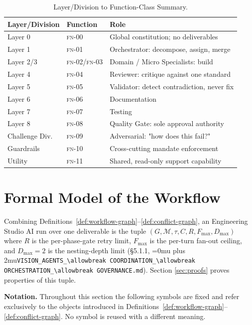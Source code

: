 \documentclass[12pt]{article}
\theoremstyle{definition}
\DeclareRobustCommand{\code}[1]{\begingroup\Urlmuskip=0mu plus 2mu\relax\nolinkurl{#1}\endgroup}
\newcommand{\FN}[1]{\textsc{fn-#1}}
\newcommand{\VisionGov}{\code{VISION\_AGENTS\_\allowbreak COORDINATION\_\allowbreak ORCHESTRATION\_\allowbreak GOVERNANCE.md}}
\begin{document}
\begin{table}[H]
\centering
\caption{Layer/Division to Function-Class Summary.}
\label{tab:layers}
\begin{tabular}{@{}llp{6.5cm}@{}}
\toprule
\textbf{Layer/Division} & \textbf{Function} & \textbf{Role} \\
\midrule
Layer 0 & \FN{00} & Global constitution; no deliverables \\
Layer 1 & \FN{01} & Orchestrator: decompose, assign, merge \\
Layer 2/3 & \FN{02}/\FN{03} & Domain / Micro Specialists: build \\
Layer 4 & \FN{04} & Reviewer: critique against one standard \\
Layer 5 & \FN{05} & Validator: detect contradiction, never fix \\
Layer 6 & \FN{06} & Documentation \\
Layer 7 & \FN{07} & Testing \\
Layer 8 & \FN{08} & Quality Gate: sole approval authority \\
Challenge Div. & \FN{09} & Adversarial: "how does this fail?" \\
Guardrails & \FN{10} & Cross-cutting mandate enforcement \\
Utility & \FN{11} & Shared, read-only support capability \\
\bottomrule
\end{tabular}
\end{table}

\section{Formal Model of the Workflow}
\label{sec:model}

Combining Definitions~\ref{def:workflow-graph}--\ref{def:conflict-graph}, an
Engineering Studio AI run over one deliverable is the tuple
$(G, \mathcal{M}, \tau, C, R, F_{\max}, D_{\max})$ where $R$ is the
per-phase-gate retry limit, $F_{\max}$ is the per-turn fan-out ceiling, and
$D_{\max} = 2$ is the nesting-depth limit (\S5.1.1,
\VisionGov{}). Section
\ref{sec:proofs} proves properties of this tuple.


\medskip
\noindent\textbf{Notation.}
Throughout this section the following symbols are fixed and refer
exclusively to the objects introduced in
Definitions~\ref{def:workflow-graph}--\ref{def:conflict-graph}.
No symbol is reused with a different meaning.
\end{document}
